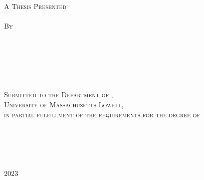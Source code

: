 
\begin{center}
		\hfill \\
		\hfill \\
		\hfill \\
\textsc{\large{
		{\thesistitle}} \\
		\hfill \\
        A Thesis Presented \\
        \hfill \\
		By \\
		\hfill \\
		\large{\thesisauthor} \\
		\hfill \\
		\hfill \\
		\hfill \\
		\hfill \\
		Submitted to the Department of {\thesisdept}, \\
        University of Massachusetts Lowell, \\
		in partial fulfillment of the requirements for the degree of}
		\hfill \\
		\hfill \\
		\hfill \\
		\hfill \\
        \MakeUppercase{\thesisdegree} \\
        \hfill \\
        2023 \\
        \hfill \\
        \hfill \\
        \hfill \\
        \hfill \\
        \hfill \\
        \hfill \\
        \hfill \\
        \hfill \\
        \mbox{\thesisdegreeprogram{}} \\
        \hfill \\
\end{center}